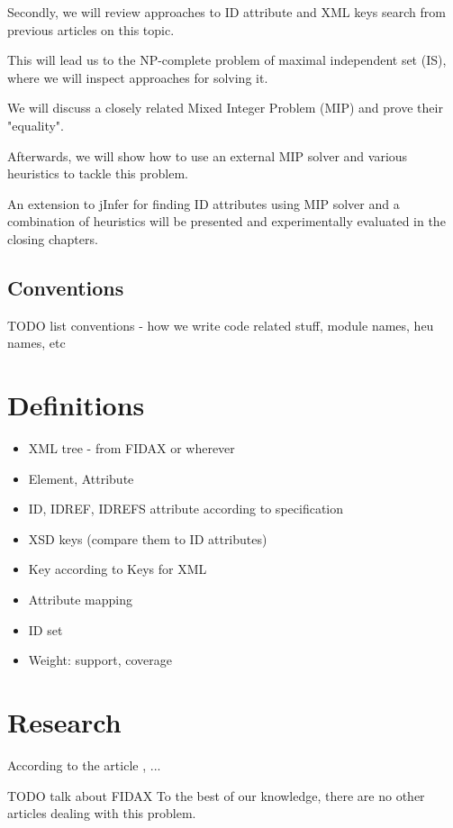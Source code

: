 \documentclass[a4paper,12pt,oneside]{report}
\theoremstyle{definition}
\begin{document}
Secondly, we will review approaches to ID attribute and XML keys search from previous articles on this topic. 

This will lead us to the NP-complete problem of maximal independent set (IS), where we will inspect approaches for solving it.

We will discuss a closely related Mixed Integer Problem (MIP) and prove their "equality".

Afterwards, we will show how to use an external MIP solver and various heuristics to tackle this problem.

An extension to jInfer for finding ID attributes using MIP solver and a combination of heuristics will be presented and experimentally evaluated in the closing chapters.

\section{Conventions}

TODO list conventions - how we write code related stuff, module names, heu names, etc

\chapter{Definitions}

\begin{itemize}
	\item XML tree - from FIDAX or wherever
	\item Element, Attribute
	\item ID, IDREF, IDREFS attribute according to specification
	\item XSD keys (compare them to ID attributes)
	\item Key according to Keys for XML \cite{keX}
	\item Attribute mapping 
	\item ID set
  \item Weight: support, coverage
\end{itemize}

\chapter{Research}

According to the article \cite{fidax}, ...

TODO talk about FIDAX
To the best of our knowledge, there are no other articles dealing with this problem. 
\end{document}
